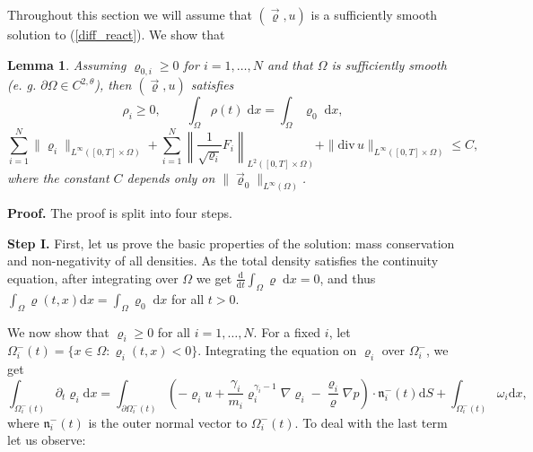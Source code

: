 \documentclass[11pt]{article}
\newcommand{\dd}{\mathrm{d}}
\newcommand{\ddiv}{\mathrm{div\,}}
\newtheorem{lem}[tw]{Lemma}
\numberwithin{equation}{section}
\numberwithin{tw}{section}
\begin{document}
Throughout this section we will assume that $(\vec\varrho,u)$ is a sufficiently smooth solution to (\ref{diff_react}). We show that
 \begin{lem}\label{oszac1}
Assuming $\varrho_{0,i}\geq 0$ for $i=1,\dots,N$ and that $\Omega$ is sufficiently smooth (e. g. $\partial\Omega\in C^{2,\theta}$), then $(\vec\varrho,u)$ satisfies
 \[ \rho_i \geq 0, \qquad \int_{\Omega} \rho (t)\;\dd x = \int_\Omega \varrho_0 \;\dd x,\]
 \[ \sum_{i=1}^N\|\varrho_i\|_{L^\infty([0,T]\times\Omega)} + \sum_{i=1}^N\left\|\frac{1}{\sqrt{\varrho_i}}F_i\right\|_{L^2([0,T]\times\Omega)} + \|\ddiv u\|_{L^\infty([0,T]\times\Omega)} \leq C, \]
 where the constant $C$ depends only on $\|\vec\varrho_0\|_{L^\infty(\Omega)}$.
 \end{lem}


{\bf Proof.} The proof is split into four steps.
\smallskip

{\bf Step I.} 
First, let us prove the basic properties of the solution:
mass conservation and non-negativity of all densities. As the total density satisfies the continuity equation, after integrating over $\Omega$ we get
$\frac{\dd}{\dd t}\int_\Omega \varrho \;\dd x = 0$,
and thus $\displaystyle\int_\Omega \varrho(t,x)\dd x = \int_\Omega \varrho_0\;\dd x$ for all $t>0$.

We  now show that $ \varrho_i\geq 0$  for all $ i=1,\dots,N.$
For a fixed $i$, let  $\Omega_i^-(t)=\{x\in \Omega: \varrho_i(t,x)<0\}. $
Integrating the equation on $\varrho_i$ over $\Omega_i^-$, we get
\[ \int_{\Omega_i^-(t)}\partial_t\varrho_i\dd x = \int_{\partial\Omega_i^-(t)}\left(-\varrho_iu + \frac{\gamma_i}{m_i}\varrho_i^{\gamma_i-1}\nabla\varrho_i-\frac{\varrho_i}{\varrho}\nabla p\right)\cdot \boldsymbol{\mathfrak{n}}_i^-(t)\dd S + \int_{\Omega_i^-(t)}\omega_i \dd x, \]
where $\boldsymbol{\mathfrak{n}}_i^-(t)$ is the outer normal vector to $\Omega_i^-(t)$. To deal with the last term let us observe:
\end{document}
